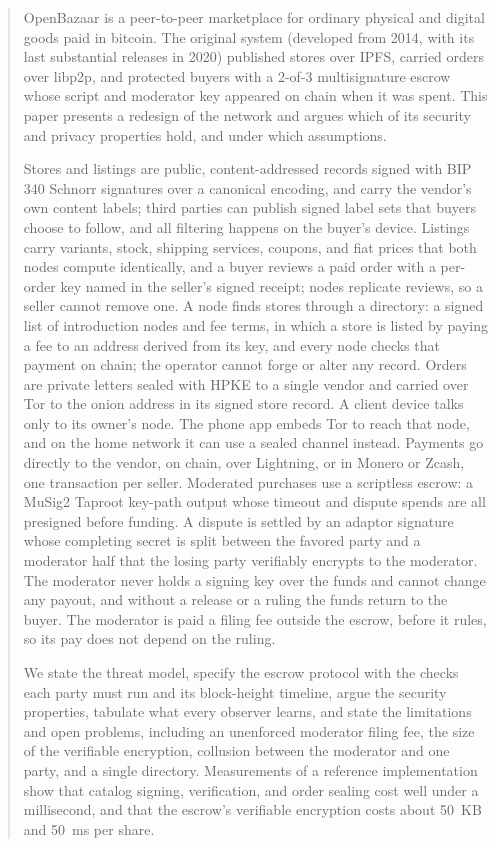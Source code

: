 \begin{abstract}
OpenBazaar is a peer-to-peer marketplace for ordinary physical and digital goods paid in bitcoin. The original system (developed from 2014, with its last substantial releases in 2020) published stores over IPFS, carried orders over libp2p, and protected buyers with a 2-of-3 multisignature escrow whose script and moderator key appeared on chain when it was spent. This paper presents a redesign of the network and argues which of its security and privacy properties hold, and under which assumptions.

Stores and listings are public, content-addressed records signed with BIP 340 Schnorr signatures over a canonical encoding, and carry the vendor's own content labels; third parties can publish signed label sets that buyers choose to follow, and all filtering happens on the buyer's device. Listings carry variants, stock, shipping services, coupons, and fiat prices that both nodes compute identically, and a buyer reviews a paid order with a per-order key named in the seller's signed receipt; nodes replicate reviews, so a seller cannot remove one. A node finds stores through a directory: a signed list of introduction nodes and fee terms, in which a store is listed by paying a fee to an address derived from its key, and every node checks that payment on chain; the operator cannot forge or alter any record. Orders are private letters sealed with HPKE to a single vendor and carried over Tor to the onion address in its signed store record. A client device talks only to its owner's node. The phone app embeds Tor to reach that node, and on the home network it can use a sealed channel instead. Payments go directly to the vendor, on chain, over Lightning, or in Monero or Zcash, one transaction per seller. Moderated purchases use a scriptless escrow: a MuSig2 Taproot key-path output whose timeout and dispute spends are all presigned before funding. A dispute is settled by an adaptor signature whose completing secret is split between the favored party and a moderator half that the losing party verifiably encrypts to the moderator. The moderator never holds a signing key over the funds and cannot change any payout, and without a release or a ruling the funds return to the buyer. The moderator is paid a filing fee outside the escrow, before it rules, so its pay does not depend on the ruling.

We state the threat model, specify the escrow protocol with the checks each party must run and its block-height timeline, argue the security properties, tabulate what every observer learns, and state the limitations and open problems, including an unenforced moderator filing fee, the size of the verifiable encryption, collusion between the moderator and one party, and a single directory. Measurements of a reference implementation show that catalog signing, verification, and order sealing cost well under a millisecond, and that the escrow's verifiable encryption costs about 50~KB and 50~ms per share.
\end{abstract}
